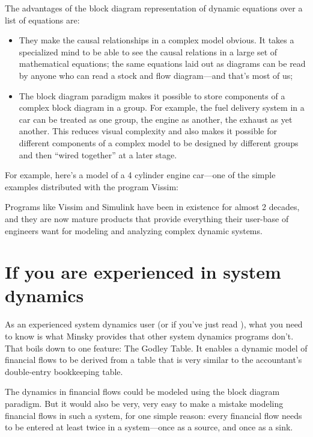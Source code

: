 The advantages of the block diagram representation of dynamic equations
over a list of equations are: 
\begin{itemize}
\item They make the causal relationships in a complex model obvious. It
takes a specialized mind to be able to see the causal relations in
a large set of mathematical equations; the same equations laid out
as diagrams can be read by anyone who can read a stock and flow diagram---and
that's most of us; 
\item The block diagram paradigm makes it possible to store components of
a complex block diagram in a group. For example, the fuel delivery
system in a car can be treated as one group, the engine as another,
the exhaust as yet another. This reduces visual complexity and also
makes it possible for different components of a complex model to be
designed by different groups and then ``wired together'' at a later
stage. 
\end{itemize}
For example, here's a model of a 4 cylinder engine car---one of the
simple examples distributed with the program Vissim:
\begin{center}
\par\end{center}

Programs like Vissim and Simulink have been in existence for almost
2 decades, and they are now mature products that provide everything
their user-base of engineers want for modeling and analyzing complex
dynamic systems. 

\section{If you are experienced in system dynamics}

\label{intro:experienced-system-dynamics}

As an experienced system dynamics user (or if you've just read ), what you need to know is what
Minsky provides that other system dynamics programs don't. That boils
down to one feature: The Godley Table. It enables a dynamic model
of financial flows to be derived from a table that is very similar
to the accountant's double-entry bookkeeping table.

The dynamics in financial flows could be modeled using the block diagram
paradigm. But it would also be very, very easy to make a mistake modeling
financial flows in such a system, for one simple reason: every financial
flow needs to be entered at least twice in a system---once as a source,
and once as a sink.


